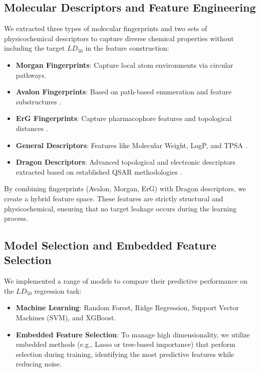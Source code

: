 \documentclass[10pt,a4paper,twocolumn]{article}
\begin{document}
\subsection{Molecular Descriptors and Feature Engineering}

We extracted three types of molecular fingerprints and two sets of
physicochemical descriptors to capture diverse chemical properties without
including the target $LD_{50}$ in the feature construction:

\begin{itemize}
    \item \textbf{Morgan Fingerprints}: Capture local atom environments via
    circular pathways.

    \item \textbf{Avalon Fingerprints}: Based on path-based enumeration and
    feature substructures \cite{Partex}.

    \item \textbf{ErG Fingerprints}: Capture pharmacophore features and
    topological distances \cite{Partex}.

    \item \textbf{General Descriptors}: Features like Molecular Weight, LogP,
    and TPSA \cite{Partex}.

    \item \textbf{Dragon Descriptors}: Advanced topological and electronic
    descriptors extracted based on established QSAR methodologies
    \cite{QSAR_Paper}.
\end{itemize}


By combining fingerprints (Avalon, Morgan, ErG) with Dragon descriptors, we
create a hybrid feature space. These features are strictly structural and
physicochemical, ensuring that no target leakage occurs during the learning
process.

\subsection{Model Selection and Embedded Feature Selection}

We implemented a range of models to compare their predictive 
performance on the $LD_{50}$ regression task:

\begin{itemize}
    \item \textbf{Machine Learning}: Random Forest, Ridge Regression, Support
    Vector Machines (SVM), and XGBoost.

    \item \textbf{Embedded Feature Selection}: To manage high dimensionality, we
    utilize embedded methods (e.g., Lasso or tree-based importance) that perform
    selection during training, identifying the most predictive features while
    reducing noise.
\end{itemize}
\end{document}
